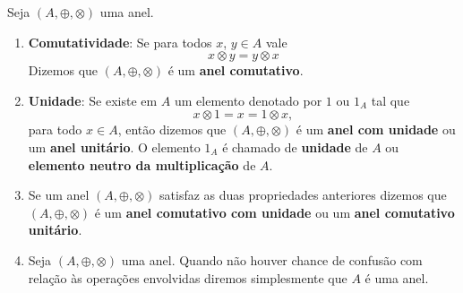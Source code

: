 \begin{observacoes}
	Seja $(A, \oplus, \otimes)$ uma anel.
	\begin{enumerate}
		\item \textbf{Comutatividade}: Se para todos $x$, $y \in A$ vale
		\[
			x \otimes y = y \otimes x
		\]
		Dizemos que $(A, \oplus, \otimes)$ {\'e} um \textbf{anel comutativo}.

		\item \textbf{Unidade}: Se existe em $A$ um elemento denotado por $1$ ou $1_{A}$ tal que
		\[
			x \otimes 1 = x = 1 \otimes x,
		\]
		para todo $x \in A$, ent{\~a}o dizemos que $(A, \oplus, \otimes)$ é um \textbf{anel com unidade} ou um \textbf{anel unit{\'a}rio}. O elemento $1_A$ {\'e} chamado de \textbf{unidade} de $A$ ou \textbf{elemento neutro da multiplicação} de $A$.

		\item Se um anel $(A, \oplus, \otimes)$ satisfaz as duas propriedades anteriores dizemos que $(A, \oplus, \otimes)$ é um \textbf{anel comutativo com unidade} ou um \textbf{anel comutativo unitário}.

		\item Seja $(A, \oplus, \otimes)$ uma anel. Quando não houver chance de confusão com relação às operações envolvidas diremos simplesmente que $A$ é uma anel.
	\end{enumerate}
\end{observacoes}


